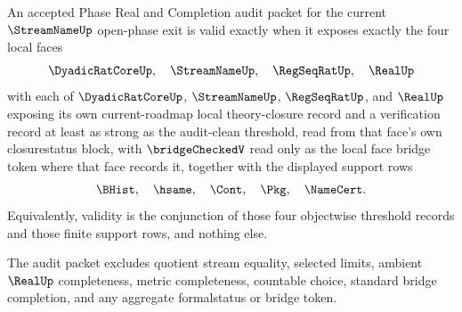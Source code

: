 \begin{theorem}
\label{thm:streamname-open-phase-exit-audit-consolidation}
An accepted Phase Real and Completion audit packet for the current $\StreamNameUp$ open-phase exit is valid exactly when it exposes exactly the four local faces
$$
\DyadicRatCoreUp,\quad \StreamNameUp,\quad \RegSeqRatUp,\quad \RealUp
$$
with each of $\DyadicRatCoreUp$, $\StreamNameUp$, $\RegSeqRatUp$, and $\RealUp$ exposing its own current-roadmap local theory-closure record and a verification record at least as strong as the audit-clean threshold, read from that face's own closurestatus block, with $\bridgeCheckedV$ read only as the local face bridge token where that face records it, together with the displayed support rows
$$
\BHist,\quad \hsame,\quad \Cont,\quad \Pkg,\quad \NameCert.
$$
Equivalently, validity is the conjunction of those four objectwise threshold records and those finite support rows, and nothing else.

The audit packet excludes quotient stream equality, selected limits, ambient $\RealUp$ completeness, metric completeness, countable choice, standard bridge completion, and any aggregate formalstatus or bridge token.
\end{theorem}

